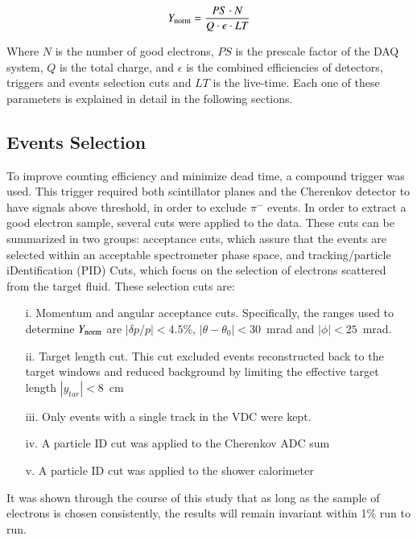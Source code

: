 \documentclass[final,5p,times,twocolumn]{elsarticle}
\begin{document}
\begin{equation}
Y_{\rm{norm}} = \frac{PS \cdot N}{ Q \cdot \epsilon \cdot LT }
\label{eq:yield}
\end{equation}

\noindent Where $N$ is the number of good electrons, $PS$ is the prescale factor of the DAQ system, 
$Q$ is the total charge, and $\epsilon $ is the combined efficiencies of detectors, triggers 
and events selection cuts and $LT$ is the live-time. Each one of these parameters is explained 
in detail in the following sections.

\subsection{Events Selection}
To improve counting efficiency and minimize dead time, a compound trigger was used. This trigger required both scintillator planes 
and the Cherenkov detector to have signals above threshold, in order to exclude $\pi^{-}$ events. In order to extract a good 
electron sample, several cuts were applied to the data. These cuts can be summarized in two groups: acceptance cuts, which 
assure that the events are selected within an acceptable spectrometer phase space, and 
tracking/particle iDentification (PID) Cuts, which focus on the selection of electrons scattered from the target fluid.
These selection cuts are:

\begin{itemize}
\item[i.] Momentum and angular acceptance cuts. Specifically, the ranges used to determine $Y_{\rm{norm}}$ are $|\delta p/p| < 4.5\%$,  
$|\theta-\theta_{0}| < 30$~mrad and $|\phi| < 25$~mrad.

\item[ii.] Target length cut. This cut excluded events reconstructed back to the target windows 
and reduced background by limiting the effective target length $|y_{tar}|<8$~cm 

\item[iii.] Only events with a single track in the VDC were kept.

\item[iv.] A particle ID cut was applied to the Cherenkov ADC sum

\item[v.] A particle ID cut was applied to the shower calorimeter

\end{itemize}

It was shown through the course of this study that as long as the sample of electrons is chosen consistently, 
the results will remain invariant within 1$\%$ run to run.
\end{document}
